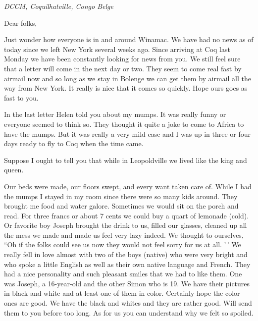 \documentclass[
]{book}
\begin{document}
\emph{DCCM, Coquilhatville, Congo Belge}

Dear folks,

Just wonder how everyone is in and around Winamac. We have had no news as of today since we left New York several weeks ago. Since arriving at Coq last Monday we have been constantly looking for news from you. We still feel sure that a letter will come in the next day or two. They seem to come real fast by airmail now and so long as we stay in Bolenge we can get them by airmail all the way from New York. It really is nice that it comes so quickly. Hope ours goes as fast to you.

In the last letter Helen told you about my mumps. It was really funny or everyone seemed to think so. They thought it quite a joke to come to Africa to have the mumps. But it was really a very mild case and I was up in three or four days ready to fly to Coq when the time came.

Suppose I ought to tell you that while in Leopoldville we lived like the king and queen.

Our beds were made, our floors swept, and every want taken care of. While I had the mumps I stayed in my room since there were so many kids around. They brought me food and water galore. Sometimes we would sit on the porch and read. For three francs or about 7 cents we could buy a quart of lemonade (cold). Or favorite boy Joseph brought the drink to us, filled our glasses, cleaned up all the mess we made and made us feel very lazy indeed. We thought to ourselves, ``Oh if the folks could see us now they would not feel sorry for us at all. '\,' We really fell in love almost with two of the boys (native) who were very bright and who spoke a little English as well as their own native language and French. They had a nice personality and such pleasant smiles that we had to like them. One was Joseph, a 16-year-old and the other Simon who is 19. We have their pictures in black and white and at least one of them in color. Certainly hope the color ones are good. We have the black and whites and they are rather good. Will send them to you before too long. As for us you can understand why we felt so spoiled.
\end{document}
